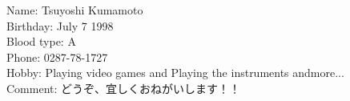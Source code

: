 \documentclass[a4paper,12pt]{jarticle}
\begin{document}
Name: Tsuyoshi Kumamoto\\
Birthday: July 7 1998\\
Blood type: A\\
Phone: 0287-78-1727\\
Hobby: Playing video games and Playing the instruments andmore...\\
Comment: どうぞ、宜しくおねがいします！！\\
\end{document}
